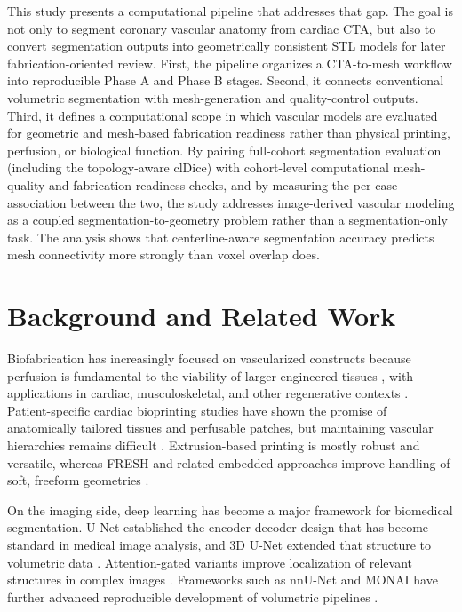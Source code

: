 \documentclass[anonymous]{iopjournal}
\begin{document}
This study presents a computational pipeline that addresses that gap. The goal is not only to segment coronary vascular anatomy from cardiac CTA, but also to convert segmentation outputs into geometrically consistent STL models for later fabrication-oriented review. First, the pipeline organizes a CTA-to-mesh workflow into reproducible Phase A and Phase B stages. Second, it connects conventional volumetric segmentation with mesh-generation and quality-control outputs. Third, it defines a computational scope in which vascular models are evaluated for geometric and mesh-based fabrication readiness rather than physical printing, perfusion, or biological function. By pairing full-cohort segmentation evaluation (including the topology-aware clDice) with cohort-level computational mesh-quality and fabrication-readiness checks, and by measuring the per-case association between the two, the study addresses image-derived vascular modeling as a coupled segmentation-to-geometry problem rather than a segmentation-only task. The analysis shows that centerline-aware segmentation accuracy predicts mesh connectivity more strongly than voxel overlap does.

\section{Background and Related Work}

Biofabrication has increasingly focused on vascularized constructs because perfusion is fundamental to the viability of larger engineered tissues \cite{groll2016,lovett2009,rouwkema2016,oconnor2022}, with applications in cardiac, musculoskeletal, and other regenerative contexts \cite{yang2023}. Patient-specific cardiac bioprinting studies have shown the promise of anatomically tailored tissues and perfusable patches, but maintaining vascular hierarchies remains difficult \cite{noor2019,wu2023,alonzo2019}. Extrusion-based printing is mostly robust and versatile, whereas FRESH and related embedded approaches improve handling of soft, freeform geometries \cite{ozbolat2016,hinton2015}.

On the imaging side, deep learning has become a major framework for biomedical segmentation. U-Net established the encoder-decoder design that has become standard in medical image analysis, and 3D U-Net extended that structure to volumetric data \cite{ronneberger2015,cicek2016}. Attention-gated variants improve localization of relevant structures in complex images \cite{oktay2018}. Frameworks such as nnU-Net and MONAI have further advanced reproducible development of volumetric pipelines \cite{isensee2021,cardoso2022}.
\end{document}
